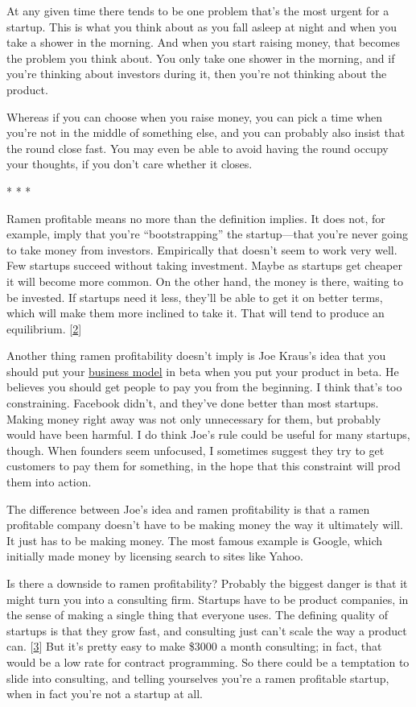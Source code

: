 At any given time there tends to be one problem that's the most urgent
for a startup. This is what you think about as you fall asleep at night
and when you take a shower in the morning. And when you start raising
money, that becomes the problem you think about. You only take one
shower in the morning, and if you're thinking about investors during it,
then you're not thinking about the product.

Whereas if you can choose when you raise money, you can pick a time when
you're not in the middle of something else, and you can probably also
insist that the round close fast. You may even be able to avoid having
the round occupy your thoughts, if you don't care whether it closes.

* * *

Ramen profitable means no more than the definition implies. It does not,
for example, imply that you're ``bootstrapping'' the startup---that
you're never going to take money from investors. Empirically that
doesn't seem to work very well. Few startups succeed without taking
investment. Maybe as startups get cheaper it will become more common. On
the other hand, the money is there, waiting to be invested. If startups
need it less, they'll be able to get it on better terms, which will make
them more inclined to take it. That will tend to produce an equilibrium.
{[}\hyperref[f2n]{2}{]}

Another thing ramen profitability doesn't imply is Joe Kraus's idea that
you should put your
\href{http://www.brendonwilson.com/blog/2006/04/30/joe-kraus-confessions-of-a-startup-addict/}{business
model} in beta when you put your product in beta. He believes you should
get people to pay you from the beginning. I think that's too
constraining. Facebook didn't, and they've done better than most
startups. Making money right away was not only unnecessary for them, but
probably would have been harmful. I do think Joe's rule could be useful
for many startups, though. When founders seem unfocused, I sometimes
suggest they try to get customers to pay them for something, in the hope
that this constraint will prod them into action.

The difference between Joe's idea and ramen profitability is that a
ramen profitable company doesn't have to be making money the way it
ultimately will. It just has to be making money. The most famous example
is Google, which initially made money by licensing search to sites like
Yahoo.

Is there a downside to ramen profitability? Probably the biggest danger
is that it might turn you into a consulting firm. Startups have to be
product companies, in the sense of making a single thing that everyone
uses. The defining quality of startups is that they grow fast, and
consulting just can't scale the way a product can.
{[}\hyperref[f3n]{3}{]} But it's pretty easy to make \$3000 a month
consulting; in fact, that would be a low rate for contract programming.
So there could be a temptation to slide into consulting, and telling
yourselves you're a ramen profitable startup, when in fact you're not a
startup at all.

